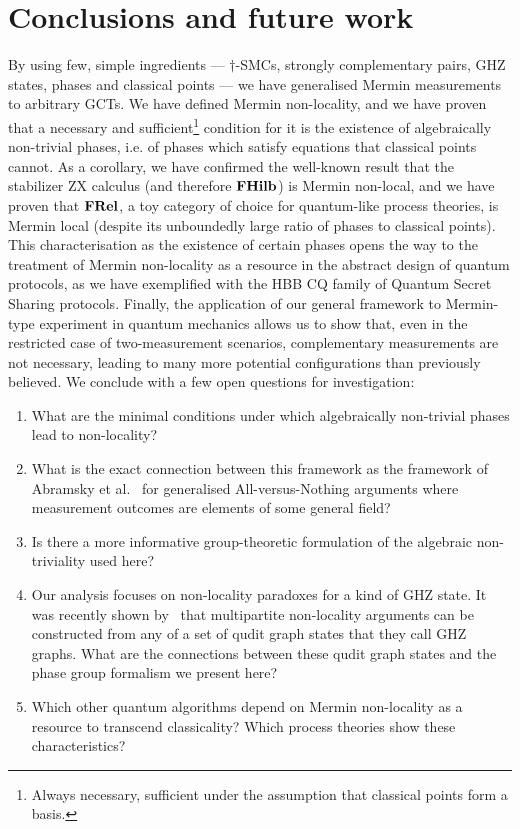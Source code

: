 
\section{Conclusions and future work}
        \label{section_conclusion}
        By using few, simple ingredients --- $\dagger$-SMCs, strongly complementary pairs, GHZ states, phases and classical points --- we have generalised Mermin measurements to arbitrary GCTs. 
        We have defined Mermin non-locality, and we have proven that a necessary and sufficient\footnote{Always necessary, sufficient under the assumption that classical points form a basis.} condition for it is the existence of algebraically non-trivial phases, i.e. of phases which satisfy equations that classical points cannot. 
        As a corollary, we have confirmed the well-known result that the stabilizer ZX calculus (and therefore $\mathbf{FHilb}$) is Mermin non-local, and we have proven that $\mathbf{FRel}$, a toy category of choice for quantum-like process theories, is Mermin local (despite its unboundedly large ratio of phases to classical points). 
        This characterisation as the existence of certain phases opens the way to the treatment of Mermin non-locality as a resource in the abstract design of quantum protocols, as we have exemplified with the HBB CQ family of Quantum Secret Sharing protocols. 
        Finally, the application of our general framework to Mermin-type experiment in quantum mechanics allows us to show that, even in the restricted case of two-measurement scenarios, complementary measurements are not necessary, leading to many more potential configurations than previously believed.
        We conclude with a few open questions for investigation:
        \begin{enumerate}
        \item What are the minimal conditions under which algebraically non-trivial phases lead to non-locality?
        \item What is the exact connection between this framework as the framework of Abramsky et al.~\cite{NLC-AvN} for generalised All-versus-Nothing arguments where measurement outcomes are elements of some general field?
        \item Is there a more informative group-theoretic formulation of the algebraic non-triviality used here?
        \item Our analysis focuses on non-locality paradoxes for a kind of GHZ state.  It was recently shown by~\cite{tang2013greenberger} that multipartite non-locality arguments can be constructed from any of a set of qudit graph states that they call GHZ graphs.  What are the connections between these qudit graph states and the phase group formalism we present here?
        \item Which other quantum algorithms depend on Mermin non-locality as a resource to transcend classicality? Which process theories show these characteristics?
        \end{enumerate}

